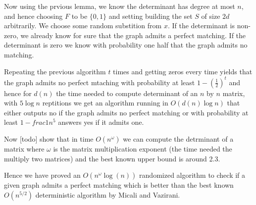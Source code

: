 	Now using the prvious lemma, we know the determinant has degree at most $n$, and hence choosing $F$ to be $\{0, 1\}$ and setting building the set $S$ of size $2d$ arbitrarily. We choose some random substition from $x$. If the determinant is non-zero, we already know for sure that the graph admits a perfect matching. If the determinant is zero we know with probability one half that the graph admits no matching.

	Repeating the previous algorithm $t$ times and getting zeros every time yields that the graph admits no perfect mtaching with probability at least $1 - (\frac{1}{2})^t$ and hence for $d(n)$ the time needed to compute determinant of an $n$ by $n$ matrix, with $5 \log n$ reptitions we get an algorithm running in $O(d(n) \log n)$ that either outputs no if the graph admits no perfect matching or with probability at least $1 - frac{1}{n^5}$ answers yes if it admits one.

	Now [todo] show that in time $O(n^\omega)$ we can compute the detrminant of a matrix where $\omega$ is the matrix multiplication exponent (the time needed the multiply two matrices) and the best known upper bound is around 2.3.

	Hence we have proved an $O(n^{\omega} \log(n))$ randomized algorithm to check if a given graph admits a perfect matching which is better than the best known $O(n^{5/2})$ deterministic algorithm by Micali and Vazirani.
